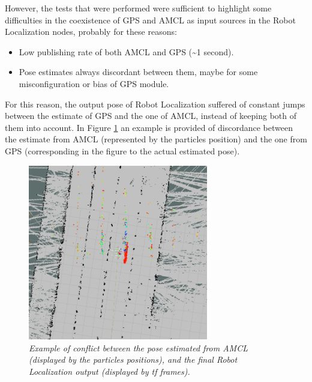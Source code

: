 However, the tests that were performed were sufficient to highlight some difficulties in the coexistence of GPS and \ac{AMCL} as input sources in the Robot Localization nodes, probably for these reasons:
\begin{itemize}
	\item Low publishing rate of both \ac{AMCL} and GPS (\textasciitilde 1 second).
	\item Pose estimates always discordant between them, maybe for some misconfiguration or bias of GPS module.
\end{itemize}
For this reason, the output pose of Robot Localization suffered of constant jumps between the estimate of GPS and the one of \ac{AMCL}, instead of keeping both of them into account. In Figure \ref{fig:amclRobotLocalization} an example is provided of discordance between the estimate from \ac{AMCL} (represented by the particles position) and the one from GPS (corresponding in the figure to the actual estimated pose).


\begin{figure}
	\centering
	\includegraphics[width=0.7\textwidth]{Images/localization/amcl_robot_localization.png}
	\caption{\textit{Example of conflict between the pose estimated from \ac{AMCL} (displayed by the particles positions), and the final Robot Localization output (displayed by tf frames).}}
	\label{fig:amclRobotLocalization}
\end{figure}




